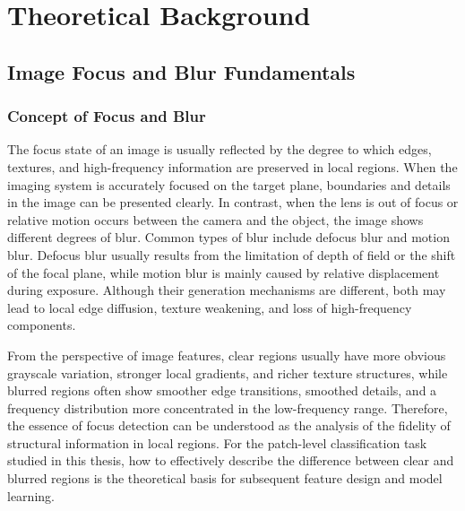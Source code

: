 \chapter{Theoretical Background}
\section{Image Focus and Blur Fundamentals}
\subsection{Concept of Focus and Blur}
\par The focus state of an image is usually reflected by the degree to which
edges, textures, and high-frequency information are preserved in local regions.
When the imaging system is accurately focused on the target plane, boundaries
and details in the image can be presented clearly. In contrast, when the lens
is out of focus or relative motion occurs between the camera and the object,
the image shows different degrees of blur. Common types of blur include
defocus blur and motion blur. Defocus blur usually results from the limitation
of depth of field or the shift of the focal plane, while motion blur is mainly
caused by relative displacement during exposure. Although their generation
mechanisms are different, both may lead to local edge diffusion, texture
weakening, and loss of high-frequency components.

\par From the perspective of image features, clear regions usually have more
obvious grayscale variation, stronger local gradients, and richer texture
structures, while blurred regions often show smoother edge transitions,
smoothed details, and a frequency distribution more concentrated in the
low-frequency range. Therefore, the essence of focus detection can be
understood as the analysis of the fidelity of structural information in local
regions. For the patch-level classification task studied in this thesis, how to
effectively describe the difference between clear and blurred regions is the
theoretical basis for subsequent feature design and model learning.

